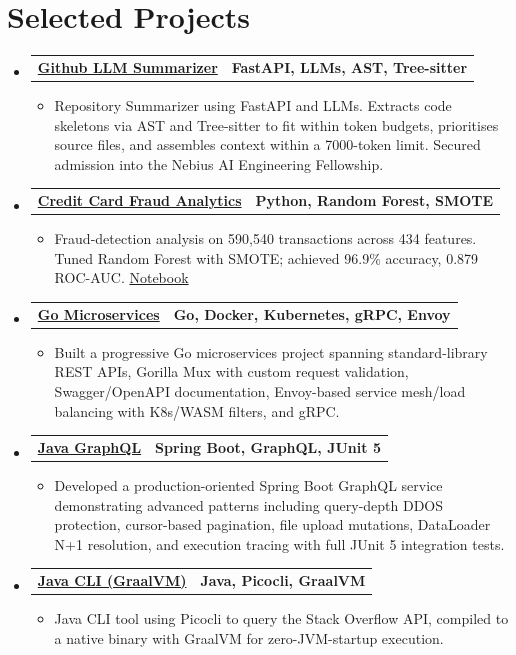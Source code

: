 \documentclass[letterpaper,11pt]{article}
\makeatletter
\newcommand{\resumeItem}[1]{
  \item\small{
    {#1 \vspace{-3pt}}
  }
}
\newcommand{\resumeProjectHeading}[2]{
  \vspace{-3pt}\item
    \begin{tabular*}{1.0\textwidth}[t]{l@{\extracolsep{\fill}}r}
      \textbf{#1} & \textbf{\small #2} \\
    \end{tabular*}\vspace{-7pt}
}
\newcommand{\resumeSubHeadingListStart}{\begin{itemize}[leftmargin=0.0in, label={}]}
\newcommand{\resumeSubHeadingListEnd}{\end{itemize}}
\newcommand{\resumeItemListStart}{\begin{itemize}}
\newcommand{\resumeItemListEnd}{\end{itemize}\vspace{0pt}}
\makeatother
\begin{document}
\section{Selected Projects}
\resumeSubHeadingListStart
    \resumeProjectHeading
        {\href{https://github.com/aymanapatel/nebius-project}{\textbf{Github LLM Summarizer}}}{FastAPI, LLMs, AST, Tree-sitter}
        \resumeItemListStart
            \resumeItem{Repository Summarizer using FastAPI and LLMs. Extracts code skeletons via AST and Tree-sitter to fit within token budgets, prioritises source files, and assembles context within a 7000-token limit. Secured admission into the Nebius AI Engineering Fellowship.}
        \resumeItemListEnd
    \resumeProjectHeading
        {\href{https://github.com/aymanapatel/qmul-all-projects/blob/main/data-analytics/coursework1/credit-card-report.pdf}{\textbf{Credit Card Fraud Analytics}}}{Python, Random Forest, SMOTE}
        \resumeItemListStart
            \resumeItem{Fraud-detection analysis on 590,540 transactions across 434 features. Tuned Random Forest with SMOTE; achieved 96.9\% accuracy, 0.879 ROC-AUC. \href{https://github.com/aymanapatel/qmul-all-projects/blob/main/data-analytics/coursework1/credit-card-notebook.ipynb}{Notebook}}
        \resumeItemListEnd
    \resumeProjectHeading
        {\href{https://github.com/aymanapatel/golang-microservices}{\textbf{Go Microservices}}}{Go, Docker, Kubernetes, gRPC, Envoy}
        \resumeItemListStart
            \resumeItem{Built a progressive Go microservices project spanning standard-library REST APIs, Gorilla Mux with custom request validation, Swagger/OpenAPI documentation, Envoy-based service mesh/load balancing with K8s/WASM filters, and gRPC.}
        \resumeItemListEnd
    \resumeProjectHeading
        {\href{https://github.com/aymanapatel/java-graphql}{\textbf{Java GraphQL}}}{Spring Boot, GraphQL, JUnit 5}
        \resumeItemListStart
            \resumeItem{Developed a production-oriented Spring Boot GraphQL service demonstrating advanced patterns including query-depth DDOS protection, cursor-based pagination, file upload mutations, DataLoader N+1 resolution, and execution tracing with full JUnit 5 integration tests.}
        \resumeItemListEnd
    \resumeProjectHeading
        {\href{https://github.com/aymanapatel/java-cli}{\textbf{Java CLI (GraalVM)}}}{Java, Picocli, GraalVM}
        \resumeItemListStart
            \resumeItem{Java CLI tool using Picocli to query the Stack Overflow API, compiled to a native binary with GraalVM for zero-JVM-startup execution.}
        \resumeItemListEnd
\resumeSubHeadingListEnd
\end{document}
